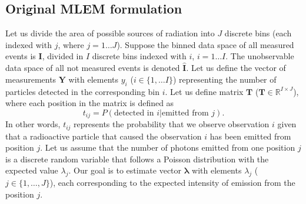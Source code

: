 \subsection{Original MLEM formulation}
Let us divide the area of possible sources of radiation into $J$ discrete bins (each indexed with $j$, where $j = 1 \dotsc J$).
Suppose the binned data space of all measured events is $\mathbf{I}$, divided in $I$ discrete bins indexed with $i$, $i = 1 \dotsc I$.
The unobservable data space of all not measured events is denoted $\mathbf{\hat{I}}$.
Let us define the vector of measurements $\mathbf{Y}$ with elements $y_{i}$ ($i \in \{1, \dots I\}$) representing the number of particles detected in the corresponding bin $i$.
Let us define matrix $\mathbf{T}$ ($\mathbf{T} \in \mathbb{R}^{I \times J}$), where each position in the matrix is defined as
\begin{equation}
  t_{ij} =  P(\textrm{detected in } i | \textrm{emitted from } j).
\end{equation}
In other words, $t_{ij}$ represents the probability that we observe observation $i$ given that a radioactive particle that caused the observation $i$ has been emitted from position $j$.
Let us assume that the number of photons emitted from one position $j$ is a discrete random variable that follows a Poisson distribution with the expected value $\lambda_{j}$.
Our goal is to estimate vector $\bm{\lambda}$ with elements $\lambda_{j}$ ($j \in \{1 , \dots, J\}$), each corresponding to the expected intensity of emission from the position $j$.

